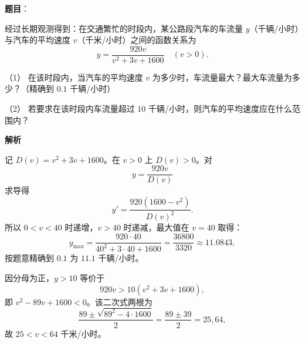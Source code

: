 \begin{answer}

\textbf{题目}：

经过长期观测得到：在交通繁忙的时段内，某公路段汽车的车流量 $y$（千辆/小时）与汽车的平均速度 $v$（千米/小时）之间的函数关系为
\nopagebreak[4]
\[
y=\frac{920v}{v^2+3v+1600}\quad(v>0).
\]

（1） 在该时段内，当汽车的平均速度 $v$ 为多少时，车流量最大？最大车流量为多少？（精确到 $0.1$ 千辆/小时）

（2） 若要求在该时段内车流量超过 $10$ 千辆/小时，则汽车的平均速度应在什么范围内？

\textbf{解析}


记 $D(v)=v^2+3v+1600$。在 $v>0$ 上 $D(v)>0$。对
\nopagebreak[4]
\[
y=\frac{920v}{D(v)}
\]
求导得
\nopagebreak[4]
\[
y'=\frac{920(1600-v^2)}{D(v)^2}.
\]
所以 $0<v<40$ 时递增，$v>40$ 时递减，最大值在 $v=40$ 取得：
\nopagebreak[4]
\[
y_{\max}=\frac{920\cdot40}{40^2+3\cdot40+1600}
=\frac{36800}{3320}\approx11.0843,
\]
按题意精确到 $0.1$ 为 $11.1$ 千辆/小时。


因分母为正，$y>10$ 等价于
\nopagebreak[4]
\[
920v>10(v^2+3v+1600),
\]
即 $v^2-89v+1600<0$。该二次式两根为
\nopagebreak[4]
\[
\frac{89\pm\sqrt{89^2-4\cdot1600}}2
=\frac{89\pm39}2=25,64,
\]
故 $25<v<64$ 千米/小时。



\end{answer}
